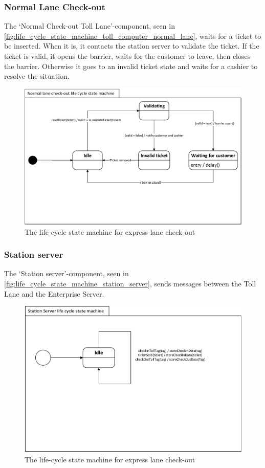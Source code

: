 \subsubsection*{Normal Lane Check-out}
The ‘Normal Check-out Toll Lane’-component, seen in \autoref{fig:life_cycle_state_machine_toll_computer_normal_lane}, waits for a ticket to be inserted. When it is, it contacts the station server to validate the ticket. If the ticket is valid, it opens the barrier, waits for the customer to leave, then closes the barrier. Otherwise it goes to an invalid ticket state and waits for a cashier to resolve the situation.
\begin{figure}[H]
\centering
\includegraphics[width=0.7\linewidth]{img/behaviour_state_machines/life_cycle_state_machines/life_cycle_state_machine_toll_computer_normal_lane}
\caption{The life-cycle state machine for express lane check-out}
\label{fig:life_cycle_state_machine_toll_computer_normal_lane}
\end{figure}

\subsubsection*{Station server}
The ‘Station server’-component, seen in \autoref{fig:life_cycle_state_machine_station_server}, sends messages between the Toll Lane and the Enterprise Server.
\begin{figure}[H]
\centering
\includegraphics[width=0.7\linewidth]{img/behaviour_state_machines/life_cycle_state_machines/life_cycle_state_machine_station_server}
\caption{The life-cycle state machine for express lane check-out}
\label{fig:life_cycle_state_machine_station_server}
\end{figure}


